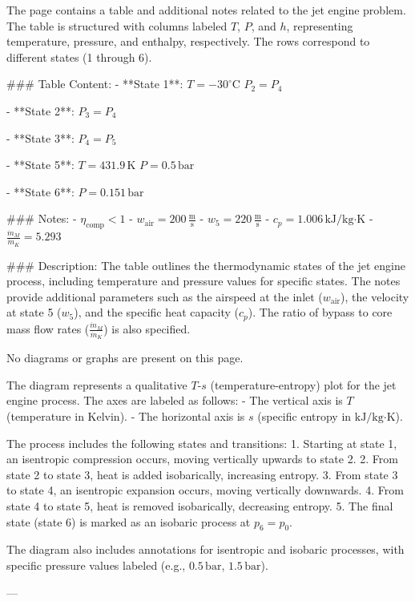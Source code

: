 The page contains a table and additional notes related to the jet engine problem. The table is structured with columns labeled \( T \), \( P \), and \( h \), representing temperature, pressure, and enthalpy, respectively. The rows correspond to different states (1 through 6).  

### Table Content:
- **State 1**:  
  \( T = -30^\circ\text{C} \)  
  \( P_2 = P_4 \)  

- **State 2**:  
  \( P_3 = P_4 \)  

- **State 3**:  
  \( P_4 = P_5 \)  

- **State 5**:  
  \( T = 431.9 \, \text{K} \)  
  \( P = 0.5 \, \text{bar} \)  

- **State 6**:  
  \( P = 0.151 \, \text{bar} \)  

### Notes:
- \( \eta_{\text{comp}} < 1 \)  
- \( w_{\text{air}} = 200 \, \frac{\text{m}}{\text{s}} \)  
- \( w_5 = 220 \, \frac{\text{m}}{\text{s}} \)  
- \( c_p = 1.006 \, \text{kJ/kg·K} \)  
- \( \frac{\dot{m}_M}{\dot{m}_K} = 5.293 \)  

### Description:
The table outlines the thermodynamic states of the jet engine process, including temperature and pressure values for specific states. The notes provide additional parameters such as the airspeed at the inlet (\( w_{\text{air}} \)), the velocity at state 5 (\( w_5 \)), and the specific heat capacity (\( c_p \)). The ratio of bypass to core mass flow rates (\( \frac{\dot{m}_M}{\dot{m}_K} \)) is also specified.  

No diagrams or graphs are present on this page.

The diagram represents a qualitative \( T \)-\( s \) (temperature-entropy) plot for the jet engine process. The axes are labeled as follows:  
- The vertical axis is \( T \) (temperature in Kelvin).  
- The horizontal axis is \( s \) (specific entropy in \( \text{kJ}/\text{kg·K} \)).  

The process includes the following states and transitions:  
1. Starting at state 1, an isentropic compression occurs, moving vertically upwards to state 2.  
2. From state 2 to state 3, heat is added isobarically, increasing entropy.  
3. From state 3 to state 4, an isentropic expansion occurs, moving vertically downwards.  
4. From state 4 to state 5, heat is removed isobarically, decreasing entropy.  
5. The final state (state 6) is marked as an isobaric process at \( p_6 = p_0 \).  

The diagram also includes annotations for isentropic and isobaric processes, with specific pressure values labeled (e.g., \( 0.5 \, \text{bar} \), \( 1.5 \, \text{bar} \)).  

---